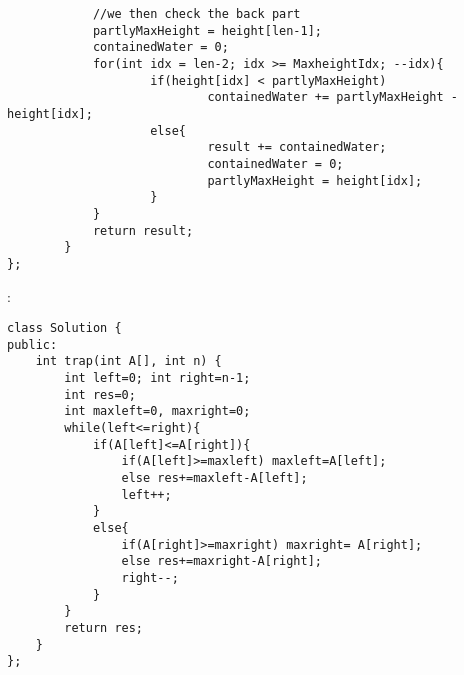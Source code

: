 \begin{description}
\begin{lstlisting}
            //we then check the back part
            partlyMaxHeight = height[len-1];
            containedWater = 0;
            for(int idx = len-2; idx >= MaxheightIdx; --idx){
                    if(height[idx] < partlyMaxHeight)
                            containedWater += partlyMaxHeight - height[idx];
                    else{
                            result += containedWater;
                            containedWater = 0;
                            partlyMaxHeight = height[idx];
                    }
            }
            return result;
    	}
};
		\end{lstlisting}
	\item{} : \\
		\begin{lstlisting}
class Solution {
public:
    int trap(int A[], int n) {
        int left=0; int right=n-1;
        int res=0;
        int maxleft=0, maxright=0;
        while(left<=right){
            if(A[left]<=A[right]){
                if(A[left]>=maxleft) maxleft=A[left];
                else res+=maxleft-A[left];
                left++;
            }
            else{
                if(A[right]>=maxright) maxright= A[right];
                else res+=maxright-A[right];
                right--;
            }
        }
        return res;
    }
};
		\end{lstlisting}

\end{description}


